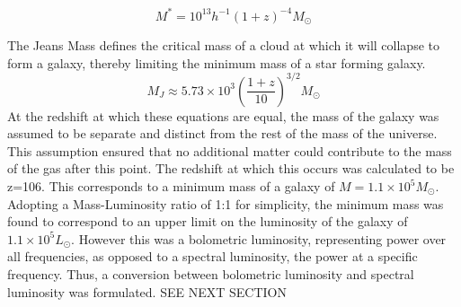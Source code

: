 \documentclass[pdf,color]{UoBnote}
\begin{document}
\begin{equation}
M^*=10^{13}h^{-1}(1+z)^{-4} M_\odot
\end{equation}

The Jeans Mass defines the critical mass of a cloud at which it will collapse to form a galaxy, thereby limiting the minimum mass of a star forming galaxy.\cite{Barkana2001125}
\begin{equation}
M_J\approx 5.73\times10^3 \left (\frac{1+z}{10} \right )^{3/2} M_{\odot}
\end{equation}
At the redshift at which these equations are equal, the mass of the galaxy was assumed to be separate and distinct from the rest of the mass of the universe. This assumption ensured that no additional matter could contribute to the mass of the gas after this point. The redshift at which this occurs was calculated to be z=106. This corresponds to a minimum mass of a galaxy of $M=1.1\times10^5M_\odot$.\\
\newline
Adopting a Mass-Luminosity ratio of 1:1 for simplicity, the minimum mass was found to correspond to an upper limit on the luminosity of the galaxy of $1.1\times 10^5 L_\odot$. However this was a bolometric luminosity, representing power over all frequencies, as opposed to a spectral luminosity, the power at  a specific frequency. Thus, a conversion between bolometric luminosity and spectral luminosity was formulated. SEE NEXT SECTION
\end{document}
